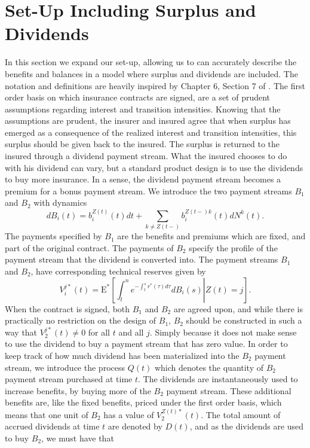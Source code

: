 \documentclass[12pt]{article}
\newcommand{\E}{\text{E}}
\theoremstyle{my_thm}
\begin{document}
\section{Set-Up Including Surplus and Dividends} \label{sec:Set_2}
In this section we expand our set-up, allowing us to can accurately describe the benefits and balances in a model where surplus and dividends are included. The notation and definitions are heavily inspired by Chapter 6, Section 7 of \citet{RaI}. The first order basis on which insurance contracts are signed, are a set of prudent assumptions regarding interest and transition intensities. Knowing that the assumptions are prudent, the insurer and insured agree that when surplus has emerged as a consequence of the realized interest and transition intensities, this surplus should be given back to the insured. The surplus is returned to the insured through a dividend payment stream. What the insured chooses to do with his dividend can vary, but a standard product design is to use the dividends to buy more insurance. In a sense, the dividend payment stream becomes a premium for a bonus payment stream. We introduce the two payment streams $B_1$ and $B_2$ with dynamics
$$
dB_i(t)=b_i^{Z(t)}(t) dt +\sum_{k \neq Z(t-)} b_i^{Z(t-)k}(t)dN^k(t).
$$
The payments specified by $B_1$ are the benefits and premiums which are fixed, and part of the original contract. The payments of $B_2$ specify the profile of the payment stream that the dividend is converted into. The payment streams $B_1$ and $B_2$, have corresponding technical reserves given by
$$
V_i^{j*}(t)=\E^* \left. \left[ \int_t^n e^{-\int_t^s r^*(\tau) d\tau} dB_i(s) \right| Z(t)=j \right].
$$
When the contract is signed, both $B_1$ and $B_2$ are agreed upon, and while there is practically no restriction on the design of $B_1$, $B_2$ should be constructed in such a way that $V_2^{j*}(t)\neq 0$ for all $t$ and all $j$. Simply because it does not make sense to use the dividend to buy a payment stream that has zero value. In order to keep track of how much dividend has been materialized into the $B_2$ payment stream, we introduce the process $Q(t)$ which denotes the quantity of $B_2$ payment stream purchased at time $t$. The dividends are instantaneously used to increase benefits, by buying more of the $B_2$ payment stream. These additional benefits are, like the fixed benefits, priced under the first order basis, which means that one unit of $B_2$ has a value of $V_2^{Z(t)*}(t)$. The total amount of accrued dividends at time $t$ are denoted by $D(t)$, and as the dividends are used to buy $B_2$, we must have that
\end{document}
